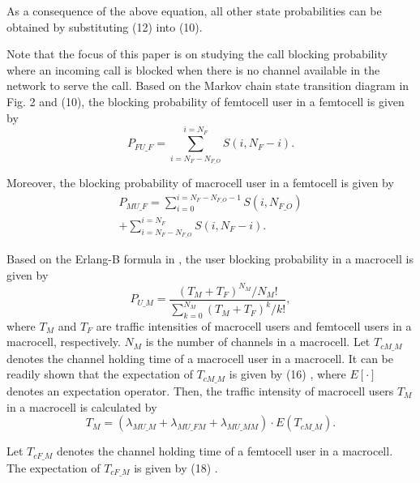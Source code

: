 \documentclass[10pt,final,journal,letterpaper,twoside,twocolumn]{IEEEtran}
\begin{document}
As a consequence of the above equation, all other state probabilities can be obtained by
substituting (12) into (10).


Note that the focus of this paper is on studying the call blocking probability where an incoming call is blocked when there is no channel available in the network to serve the call. Based on the Markov chain state transition diagram in Fig. 2 and (10), the blocking probability of femtocell user in a femtocell is given by
\begin{equation}
{P_{FU\_F}} = \sum\limits_{i = {N_F} - {N_{F\_O}}}^{i = {N_F}} {S\left( {i,{N_F} - i} \right)} .
\label{eq19}
\tag{13}
\end{equation}

Moreover, the blocking probability of macrocell user in a femtocell is given by
\begin{equation}
\begin{split}
{P_{MU\_F}} = \sum\limits_{i = 0}^{i = {N_F} - {N_{F\_O}} - 1} {S\left( {i,{N_{F\_O}}} \right)}\\
+ \sum\limits_{i = {N_F} - {N_{F\_O}}}^{i = {N_F}} {S\left( {i,{N_F} - i} \right)} .
\end{split}
\label{eq20}
\tag{14}
\end{equation}

Based on the Erlang-B formula in \cite{Kleinrock75}, the user blocking probability in a macrocell is given by
\begin{equation}
{P_{U\_M}} = \frac{{{{\left( {{T_M} + {T_F}} \right)}^{{N_M}}}/{N_M}!}}{{\sum\nolimits_{k = 0}^{{N_M}} {{{\left( {{T_M} + {T_F}} \right)}^k}/k!} }},
\label{eq21}
\tag{15}
\end{equation}
where ${T_M}$ and ${T_F}$ are traffic intensities of macrocell users and
femtocell users in a macrocell, respectively. ${N_M}$ is the number of
channels in a macrocell. Let ${T_{cM\_M}}$ denotes the channel holding time of a macrocell
user in a macrocell. It can be readily shown that the expectation of ${T_{cM\_M}}$ is given by (16) \cite{Zhang10},
where ${E\left[\cdot\right]}$ denotes an expectation operator. Then, the traffic intensity of macrocell users ${T_M}$ in a macrocell
is calculated by
\begin{equation}
{T_M} = \left( {{\lambda _{MU\_M}} + {\lambda _{MU\_FM}} + {\lambda _{MU\_MM}}} \right) \cdot E\left( {T_{cM\_M}} \right).
\label{eq24}
\tag{17}
\end{equation}

Let ${T_{cF\_M}}$ denotes the channel holding time of a femtocell user in a macrocell.
The expectation of ${T_{cF\_M}}$ is given by (18) \cite{Zhang10} .
\end{document}
